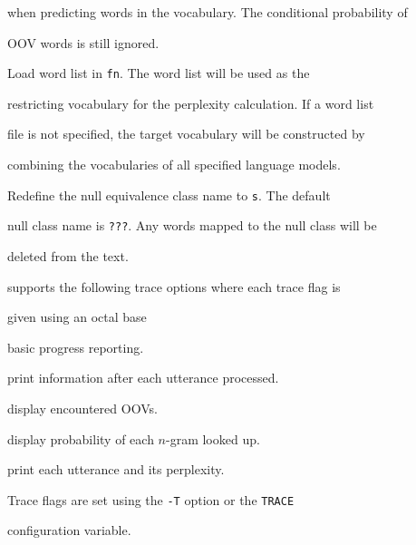 \begin{optlist}
	when predicting words in the vocabulary. The conditional probability of


	OOV words is still ignored.





   Load word list in {\tt fn}. The word list will be used as the


	restricting vocabulary for the perplexity calculation. If a word list


	file is not specified, the target vocabulary will be constructed by


	combining the vocabularies of all specified language models.





   Redefine the null equivalence class name to {\tt s}. The default 


	null class name is {\tt ???}. Any words mapped to the null class will be


	deleted from the text.


\end{optlist}












 supports the following trace options where each trace flag is 


given using an octal base


\begin{optlist}


   basic progress reporting. 


   print information after each utterance processed.


   display encountered OOVs.


   display probability of each $n$-gram looked up.


   print each utterance and its perplexity.


\end{optlist}


Trace flags are set using the \texttt{-T} option or the \texttt{TRACE}


configuration variable.




